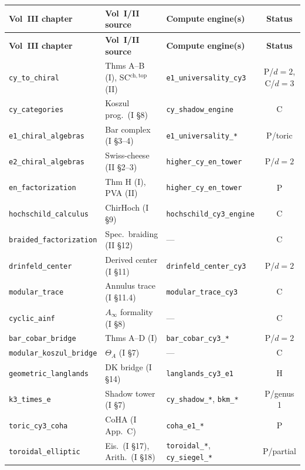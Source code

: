 \documentclass[11pt]{article}
\begin{document}
\medskip
\begin{center}
\small
\renewcommand{\arraystretch}{1.15}
\begin{longtable}{@{}l@{\;\;}l@{\;\;}l@{\;\;}c@{}}
 \toprule
 \textbf{Vol~III chapter} & \textbf{Vol~I/II source} & \textbf{Compute engine(s)} & \textbf{Status} \\
 \midrule
 \endfirsthead
 \toprule
 \textbf{Vol~III chapter} & \textbf{Vol~I/II source} & \textbf{Compute engine(s)} & \textbf{Status} \\
 \midrule
 \endhead
 \texttt{cy\_to\_chiral} & Thms A--B (I), SC$^{\mathrm{ch,top}}$ (II) & \texttt{e1\_universality\_cy3} & P/$d{=}2$, C/$d{=}3$ \\
 \texttt{cy\_categories} & Koszul prog.\ (I \S8) & \texttt{cy\_shadow\_engine} & C \\
 \texttt{e1\_chiral\_algebras} & Bar complex (I \S3--4) & \texttt{e1\_universality\_*} & P/toric \\
 \texttt{e2\_chiral\_algebras} & Swiss-cheese (II \S2--3) & \texttt{higher\_cy\_en\_tower} & P/$d{=}2$ \\
 \texttt{en\_factorization} & Thm H (I), PVA (II) & \texttt{higher\_cy\_en\_tower} & P \\
 \texttt{hochschild\_calculus} & ChirHoch (I \S9) & \texttt{hochschild\_cy3\_engine} & C \\
 \texttt{braided\_factorization} & Spec.\ braiding (II \S12) & --- & C \\
 \texttt{drinfeld\_center} & Derived center (I \S11) & \texttt{drinfeld\_center\_cy3} & P/$d{=}2$ \\
 \texttt{modular\_trace} & Annulus trace (I \S11.4) & \texttt{modular\_trace\_cy3} & C \\
 \texttt{cyclic\_ainf} & $A_\infty$ formality (I \S8) & --- & C \\
 \texttt{bar\_cobar\_bridge} & Thms A--D (I) & \texttt{bar\_cobar\_cy3\_*} & P/$d{=}2$ \\
 \texttt{modular\_koszul\_bridge} & $\Theta_A$ (I \S7) & --- & C \\
 \texttt{geometric\_langlands} & DK bridge (I \S14) & \texttt{langlands\_cy3\_e1} & H \\
 \texttt{k3\_times\_e} & Shadow tower (I \S7) & \texttt{cy\_shadow\_*}, \texttt{bkm\_*} & P/genus 1 \\
 \texttt{toric\_cy3\_coha} & CoHA (I App.~C) & \texttt{coha\_e1\_*} & P \\
 \texttt{toroidal\_elliptic} & Eis.\ (I \S17), Arith.\ (I \S18) & \texttt{toroidal\_*}, \texttt{cy\_siegel\_*} & P/partial \\
 \bottomrule
\end{longtable}
\end{center}
\end{document}
